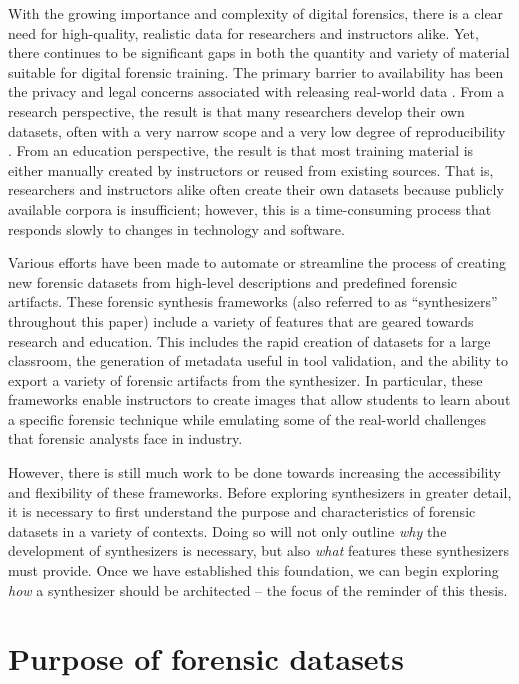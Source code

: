 \documentclass[letterpaper,12pt]{report}
\begin{document}
With the growing importance and complexity of digital forensics, there
is a clear need for high-quality, realistic data for researchers and
instructors alike. Yet, there continues to be significant gaps in both
the quantity and variety of material suitable for digital forensic
training. The primary barrier to availability has been the privacy and
legal concerns associated with releasing real-world data
\cite{garfinkelForensicCorporaChallenge2007}. From a research
perspective, the result is that many researchers develop their own
datasets, often with a very narrow scope and a very low degree of
reproducibility
\cite{garfinkelBringingScienceDigital2009,grajedaAvailabilityDatasetsDigital2017}.
From an education perspective, the result is that most training material
is either manually created by instructors or reused from existing
sources. That is, researchers and instructors alike often create their
own datasets because publicly available corpora is insufficient;
however, this is a time-consuming process that responds slowly to
changes in technology and software.

Various efforts have been made to automate or streamline the process of
creating new forensic datasets from high-level descriptions and
predefined forensic artifacts. These forensic synthesis frameworks (also
referred to as ``synthesizers'' throughout this paper) include a variety
of features that are geared towards research and education. This
includes the rapid creation of datasets for a large classroom, the
generation of metadata useful in tool validation, and the ability to
export a variety of forensic artifacts from the synthesizer. In
particular, these frameworks enable instructors to create images that
allow students to learn about a specific forensic technique while
emulating some of the real-world challenges that forensic analysts face
in industry.

However, there is still much work to be done towards increasing the
accessibility and flexibility of these frameworks. Before exploring
synthesizers in greater detail, it is necessary to first understand the
purpose and characteristics of forensic datasets in a variety of
contexts. Doing so will not only outline \emph{why} the development of
synthesizers is necessary, but also \emph{what} features these
synthesizers must provide. Once we have established this foundation, we
can begin exploring \emph{how} a synthesizer should be architected --
the focus of the reminder of this thesis.

\section{Purpose of forensic
datasets}\label{purpose-of-forensic-datasets}
\end{document}

